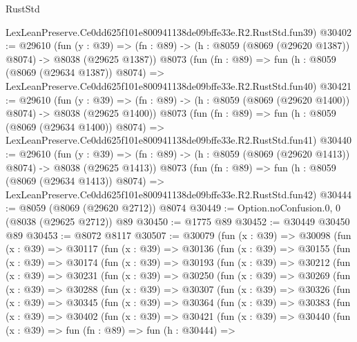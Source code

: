 \begin{lexlean}{RustStd}
\begin{coremodule}
    LexLeanPreserve.Ce0dd625f101e800941138de09bffe33e.R2.RustStd.fun39)
@30402 := @29610
    (fun (y : @39) =>
    (fn : @89) -> (h : @8059 (@8069 (@29620 @1387)) @8074) -> @8038 (@29625 @1387))
    @8073
    (fun (fn : @89) =>
    fun (h : @8059 (@8069 (@29634 @1387)) @8074) =>
    LexLeanPreserve.Ce0dd625f101e800941138de09bffe33e.R2.RustStd.fun40)
@30421 := @29610
    (fun (y : @39) =>
    (fn : @89) -> (h : @8059 (@8069 (@29620 @1400)) @8074) -> @8038 (@29625 @1400))
    @8073
    (fun (fn : @89) =>
    fun (h : @8059 (@8069 (@29634 @1400)) @8074) =>
    LexLeanPreserve.Ce0dd625f101e800941138de09bffe33e.R2.RustStd.fun41)
@30440 := @29610
    (fun (y : @39) =>
    (fn : @89) -> (h : @8059 (@8069 (@29620 @1413)) @8074) -> @8038 (@29625 @1413))
    @8073
    (fun (fn : @89) =>
    fun (h : @8059 (@8069 (@29634 @1413)) @8074) =>
    LexLeanPreserve.Ce0dd625f101e800941138de09bffe33e.R2.RustStd.fun42)
@30444 := @8059 (@8069 (@29620 @2712)) @8074
@30449 := Option.noConfusion.{0, 0} (@8038 (@29625 @2712)) @89
@30450 := @1775 @89
@30452 := @30449 @30450 @89
@30453 := @8072 @8117
@30507 := @30079
    (fun (x : @39) =>
    @30098
      (fun (x : @39) =>
      @30117
        (fun (x : @39) =>
        @30136
          (fun (x : @39) =>
          @30155
            (fun (x : @39) =>
            @30174
              (fun (x : @39) =>
              @30193
                (fun (x : @39) =>
                @30212
                  (fun (x : @39) =>
                  @30231
                    (fun (x : @39) =>
                    @30250
                      (fun (x : @39) =>
                      @30269
                        (fun (x : @39) =>
                        @30288
                          (fun (x : @39) =>
                          @30307
                            (fun (x : @39) =>
                            @30326
                              (fun (x : @39) =>
                              @30345
                                (fun (x : @39) =>
                                @30364
                                  (fun (x : @39) =>
                                  @30383
                                    (fun (x : @39) =>
                                    @30402
                                      (fun (x : @39) =>
                                      @30421
                                        (fun (x : @39) =>
                                        @30440
                                          (fun (x : @39) =>
                                          fun (fn : @89) =>
                                          fun (h : @30444) =>

\end{coremodule}
\end{lexlean}
